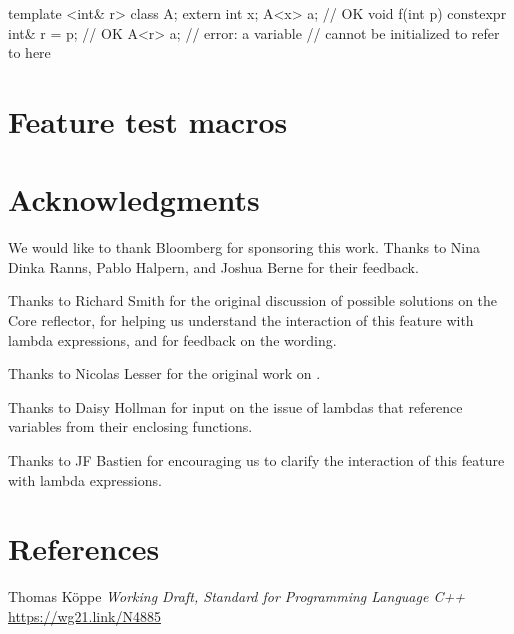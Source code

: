 \documentclass{wg21}
\begin{document}

\begin{addedblock}
\begin{example}
\begin{codeblock}
template <int& r> class A;
extern int x;
A<x> a;  // OK
void f(int p) {
    constexpr int& r = p;  // OK
    A<r> a;                // error: a  variable
                           // cannot be initialized to refer to  here
}
\end{codeblock}
\end{example}
\end{addedblock}

\section{Feature test macros}


 

\section{Acknowledgments}

We would like to thank Bloomberg for sponsoring this work.
Thanks to Nina Dinka Ranns, Pablo Halpern, and Joshua Berne for their feedback.

Thanks to Richard Smith for the original discussion of possible solutions on the Core reflector, for helping us understand the interaction of this feature with lambda expressions, and for feedback on the wording.

Thanks to Nicolas Lesser for the original work on .

Thanks to Daisy Hollman for input on the issue of lambdas that reference
variables from their enclosing functions.

Thanks to JF Bastien for encouraging us to clarify the interaction of this
feature with lambda expressions.

\section{References}

\renewcommand{\section}[2]{}%



\begin{thebibliography}{9}

Thomas Köppe
\emph{Working Draft, Standard for Programming Language C++}\newline
\url{https://wg21.link/N4885}


\end{thebibliography}
\end{document}
